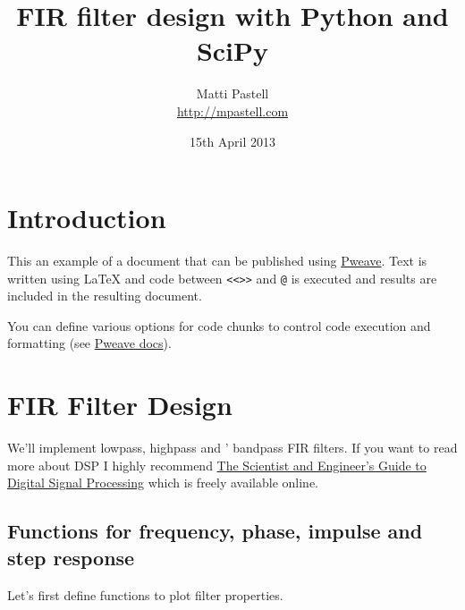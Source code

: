 \documentclass[a4paper,11pt,final]{article}
\title{FIR filter design with Python and SciPy}
\author{Matti Pastell \\ \url{http://mpastell.com}}
\date{15th April 2013}
\begin{document}
\maketitle


\section{Introduction}

This an example of a document that can be published using
\href{http://mpastell.com/pweave}{Pweave}. Text is written
using \LaTeX{} and code between \texttt{<<>>} and \texttt{@} is executed
and results are included in the resulting document.

You can define various options for code chunks to control code
execution and formatting (see
\href{http://mpastell.com/pweave/usage.html\#code-chunk-options}{Pweave
docs}).

\section{FIR Filter Design}

We'll implement lowpass, highpass and ' bandpass FIR filters. If you
want to read more about DSP I highly recommend
\href{http://www.dspguide.com/}{The Scientist and Engineer's Guide to
Digital Signal Processing} which is freely available online.

\subsection{Functions for frequency, phase, impulse and step response}

Let's first define functions to plot filter properties.
\end{document}
